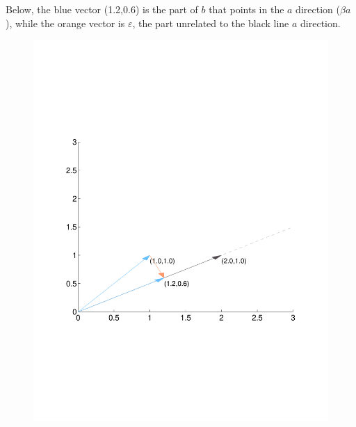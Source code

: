 \documentclass[12pt]{article}
\theoremstyle{plain}
\theoremstyle{definition}
\theoremstyle{remark}
\begin{document}
Below, the blue vector (1.2,0.6) is the part of $b$ that points in the
$a$ direction ($\beta a$), while the orange vector is $\varepsilon$, the
part unrelated to the black line $a$ direction.

\begin{figure}[htpb!]
  \centering
  \includegraphics[scale=0.5, trim={2cm, 7.2cm, 2cm, 7.2cm}, clip]{Plots/StateSpaceGeometry3.pdf}
\end{figure}
\end{document}
